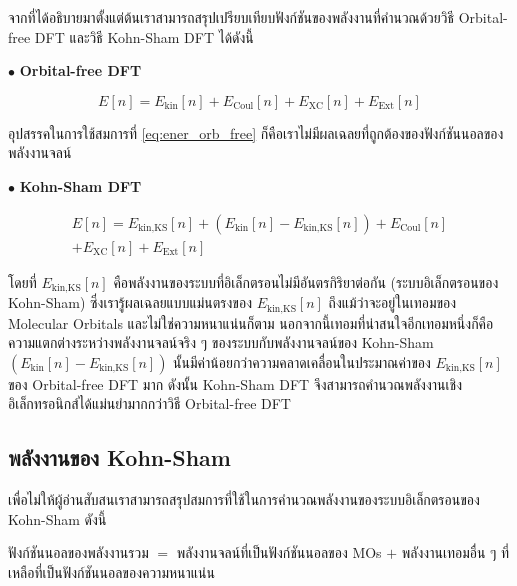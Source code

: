 จากที่ได้อธิบายมาตั้งแต่ต้นเราสามารถสรุปเปรียบเทียบฟังก์ชันของพลังงานที่คำนวณด้วยวิธี Orbital-free DFT และวิธี Kohn-Sham DFT ได้ดังนี้

\noindent $\bullet$ \textbf{Orbital-free DFT}

\begin{equation}\label{eq:ener_orb_free}
    E[n] = E_{\text{kin}}[n] + E_{\text{Coul}}[n] + E_{\text{XC}}[n] + E_{\text{Ext}}[n]
\end{equation}

\noindent อุปสรรคในการใช้สมการที่ \ref{eq:ener_orb_free} ก็คือเราไม่มีผลเฉลยที่ถูกต้องของฟังก์ชันนอลของพลังงานจลน์

\noindent $\bullet$ \textbf{Kohn-Sham DFT}

\begin{multline}\label{eq:ener_kohn_sham}
    E[n] = E_{\text{kin,KS}}[n] + (E_{\text{kin}}[n] - E_{\text{kin,KS}}[n]) + E_{\text{Coul}}[n] \\
    + E_{\text{XC}}[n] + E_{\text{Ext}}[n]
\end{multline}

\noindent โดยที่ $E_{\text{kin,KS}}[n]$ คือพลังงานของระบบที่อิเล็กตรอนไม่มีอันตรกิริยาต่อกัน (ระบบอิเล็กตรอนของ Kohn-Sham) 
ซึ่งเรารู้ผลเฉลยแบบแม่นตรงของ $E_{\text{kin,KS}}[n]$ ถึงแม้ว่าจะอยู่ในเทอมของ Molecular Orbitals และไม่ใช่ความหนาแน่นก็ตาม
นอกจากนี้เทอมที่น่าสนใจอีกเทอมหนึ่งก็คือความแตกต่างระหว่างพลังงานจลน์จริง ๆ ของระบบกับพลังงานจลน์ของ Kohn-Sham 
$(E_{\text{kin}}[n] - E_{\text{kin,KS}}[n])$ นั้นมีค่าน้อยกว่าความคลาดเคลื่อนในประมาณค่าของ $E_{\text{kin,KS}}[n]$ ของ
Orbital-free DFT มาก ดังนั้น Kohn-Sham DFT จึงสามารถคำนวณพลังงานเชิงอิเล็กทรอนิกส์ได้แม่นยำมากกว่าวิธี Orbital-free DFT

\subsection{พลังงานของ Kohn-Sham}
\label{ssec:kohn_sham_ener_expr}

เพื่อไม่ให้ผู้อ่านสับสนเราสามารถสรุปสมการที่ใช้ในการคำนวณพลังงานของระบบอิเล็กตรอนของ Kohn-Sham ดังนี้

\begin{framed}
    ฟังก์ชันนอลของพลังงานรวม $=$ พลังงานจลน์ที่เป็นฟังก์ชันนอลของ MOs $+$ พลังงานเทอมอื่น ๆ ที่เหลือที่เป็นฟังก์ชันนอลของความหนาแน่น 
\end{framed}

